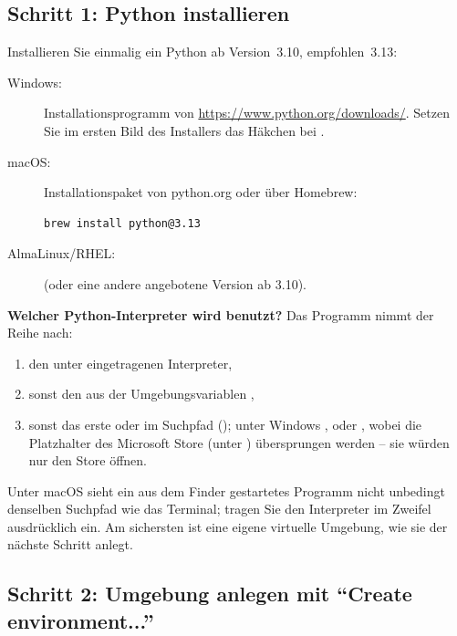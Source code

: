 \subsection{Schritt 1: Python installieren}

Installieren Sie einmalig ein Python ab Version~3.10, empfohlen~3.13:

\begin{description}
  \item[Windows:] Installationsprogramm von \url{https://www.python.org/downloads/}. Setzen Sie
    im ersten Bild des Installers das Häkchen bei .
  \item[macOS:] Installationspaket von python.org oder über Homebrew:
\begin{lstlisting}
brew install python@3.13
\end{lstlisting}
  \item[AlmaLinux/RHEL:]  (oder eine andere angebotene
    Version ab 3.10).
\end{description}

\begin{hinweis}
\textbf{Welcher Python-Interpreter wird benutzt?} Das Programm nimmt der Reihe nach:
\begin{enumerate}
  \item den unter  eingetragenen Interpreter,
  \item sonst den aus der Umgebungsvariablen ,
  \item sonst das erste  oder  im Suchpfad (); unter
    Windows ,  oder , wobei die Platzhalter des
    Microsoft Store (unter ) übersprungen
    werden -- sie würden nur den Store öffnen.
\end{enumerate}
Unter macOS sieht ein aus dem Finder gestartetes Programm nicht unbedingt denselben
Suchpfad wie das Terminal; tragen Sie den Interpreter im Zweifel ausdrücklich ein. Am
sichersten ist eine eigene virtuelle Umgebung, wie sie der nächste Schritt anlegt.
\end{hinweis}

\subsection{Schritt 2: Umgebung anlegen mit \enquote{Create environment...}}
\label{sec:create-environment}

